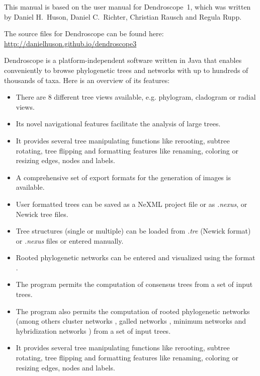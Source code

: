 \documentclass[11pt]{article}
\def\Dendroscope{{\sf Dendroscope }}
\begin{document}
This manual is based on the user manual for Dendroscope~1, which was written by
Daniel H.~Huson, Daniel C.~Richter, Christian Rausch and Regula Rupp.

The source files for \Dendroscope can be found here: \url{http://danielhuson.github.io/dendroscope3}

\Dendroscope is a platform-independent software written in Java that enables conveniently to 
browse phylogenetic trees  and networks with up to hundreds of thousands of taxa.
Here is an overview of its features:
\begin{itemize}
\item There are 8 different tree views available, e.g. phylogram, cladogram or radial views.
\item Its novel navigational features facilitate the analysis of large trees.
\item It provides several tree manipulating functions like 
rerooting, subtree rotating, tree flipping and formatting features like renaming,
coloring or resizing edges, nodes and labels. 
\item A comprehensive set of export formats for the generation of images is available.
\item User formatted trees can be saved as a NeXML project file or as \textit{.nexus}, or Newick tree files. 
\item Tree structures (single or multiple) can be loaded from  \textit{.tre} (Newick format) or \textit{.nexus} files or entered manually.
\item Rooted phylogenetic networks can be entered and visualized using the  format \cite{Cardona2008}.
\item 
The program permits the computation of consensus trees  from a set of input trees.
\item The program also permits  the computation of rooted phylogenetic networks (among others cluster networks \cite{ClusterNetworks2008}, {galled networks} \cite{GalledNetworks2009}, {minimum networks} \cite{LevelKClusters2010} and hybridization networks  \cite{Albrecht2012,HusonLinz2015}) from a set of input trees.
\item It provides several tree manipulating functions like 
rerooting, subtree rotating, tree flipping and formatting features like renaming,
coloring or resizing edges, nodes and labels. 


\end{itemize}
\end{document}
